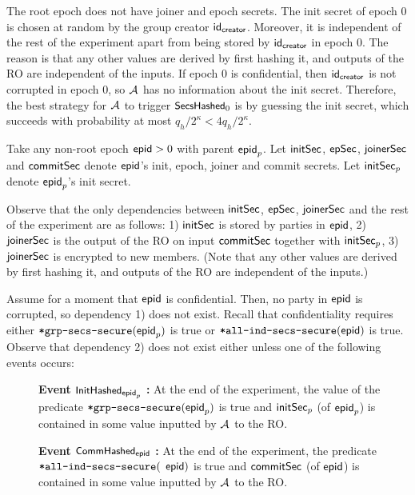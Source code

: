 The root epoch does not have joiner and epoch secrets. The init secret of epoch $0$ is chosen at random by the group creator ${\mathsf{id}}_\mathsf{creator}$. Moreover, it is independent of the rest of the experiment apart from being stored by ${\mathsf{id}}_\mathsf{creator}$ in epoch $0$. The reason is that any other values are derived by first hashing it, and outputs of the RO are independent of the inputs.
If epoch $0$ is confidential, then ${\mathsf{id}}_\mathsf{creator}$ is not corrupted in epoch $0$, so $\mathcal{A}_{\relax}$ has no information about the init secret. Therefore, the best strategy for $\mathcal{A}_{\relax}$ to trigger $\textnormal{\textsf{\small SecsHashed}}_0$ is by guessing the init secret, which succeeds with probability at most $q_h/2^\kappa < 4q_h/2^\kappa$.

Take any non-root epoch ${\normalfont\textsf{epid}}>0$ with parent ${\normalfont\textsf{epid}}_p$. Let ${\mathsf{initSec}}$, ${\mathsf{epSec}}$, ${\mathsf{joinerSec}}$ and ${\mathsf{commitSec}}$ denote ${\normalfont\textsf{epid}}$'s init, epoch, joiner and commit secrets. Let ${\mathsf{initSec}}_p$ denote ${\normalfont\textsf{epid}}_p$'s init secret.

Observe that the only dependencies between ${\mathsf{initSec}}$, ${\mathsf{epSec}}$, ${\mathsf{joinerSec}}$ and the rest of the experiment are as follows: 1) ${\mathsf{initSec}}$ is stored by parties in ${\normalfont\textsf{epid}}$, 2) ${\mathsf{joinerSec}}$ is the output of the RO on input ${\mathsf{commitSec}}$ together with ${\mathsf{initSec}}_p$, 3) ${\mathsf{joinerSec}}$ is encrypted to new members. (Note that any other values are derived by first hashing it, and outputs of the RO are independent of the inputs.)

Assume for a moment that ${\normalfont\textsf{epid}}$ is confidential. Then, no party in ${\normalfont\textsf{epid}}$ is corrupted, so dependency 1) does not exist. Recall that confidentiality requires either ${\textnormal{\tt*grp-secs-secure}}({\normalfont\textsf{epid}}_p)$ is true or ${\textnormal{\tt*all-ind-secs-secure}}({\normalfont\textsf{epid}})$ is true. Observe that dependency 2) does not exist either unless one of the following events occurs:
\begin{description}
  \item[] {\bf Event $\textnormal{\textsf{\small InitHashed}}_{{\normalfont\textsf{epid}}_p}$ : } At the end of the experiment, the value of the predicate ${\textnormal{\tt*grp-secs-secure}}({\normalfont\textsf{epid}}_p)$ is true and ${\mathsf{initSec}}_p$ (of ${\normalfont\textsf{epid}}_p$) is contained in some value inputted by $\mathcal{A}_{\relax}$ to the RO.
  \item[] {\bf Event $\textnormal{\textsf{\small CommHashed}}_{{\normalfont\textsf{epid}}}$ : } At the end of the experiment, the predicate ${\textnormal{\tt*all-ind-secs-secure}}($ ${\normalfont\textsf{epid}})$ is true and ${\mathsf{commitSec}}$ (of ${\normalfont\textsf{epid}}$) is contained in some value inputted by $\mathcal{A}_{\relax}$ to the RO.
\end{description}


